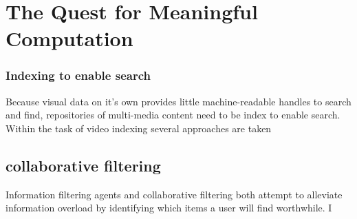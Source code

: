 \chapter{The Quest for Meaningful Computation}
\label{chap:quest}



\subsection{Indexing to enable search}
Because visual data on it's own provides little machine-readable handles to search and find, repositories of multi-media content need to be index to enable search. Within the task of video indexing several approaches are taken 


\section{collaborative filtering}
Information filtering agents and collaborative filtering both
attempt to alleviate information overload by identifying
which items a user will find worthwhile.  I